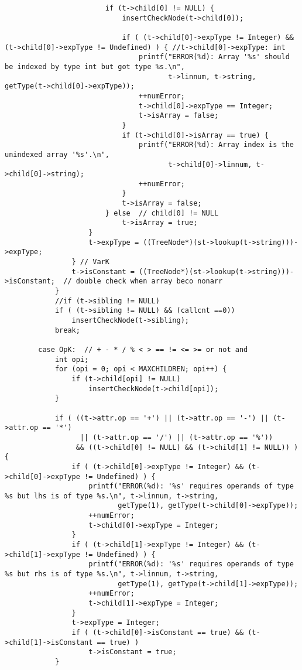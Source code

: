 \documentclass[12pt]{book}
\begin{document}
\begin{lstlisting}
                        if (t->child[0] != NULL) {
                            insertCheckNode(t->child[0]);

                            if ( (t->child[0]->expType != Integer) && (t->child[0]->expType != Undefined) ) { //t->child[0]->expType: int
                                printf("ERROR(%d): Array '%s' should be indexed by type int but got type %s.\n", 
                                       t->linnum, t->string, getType(t->child[0]->expType));
                                ++numError;
                                t->child[0]->expType == Integer;
                                t->isArray = false;
                            }
                            if (t->child[0]->isArray == true) {
                                printf("ERROR(%d): Array index is the unindexed array '%s'.\n", 
                                       t->child[0]->linnum, t->child[0]->string);
                                ++numError;
                            }
                            t->isArray = false;
                        } else  // child[0] != NULL
                            t->isArray = true; 
                    }
                    t->expType = ((TreeNode*)(st->lookup(t->string)))->expType;
                } // VarK
                t->isConstant = ((TreeNode*)(st->lookup(t->string)))->isConstant;  // double check when array beco nonarr
            }
            //if (t->sibling != NULL)
            if ( (t->sibling != NULL) && (callcnt ==0))
                insertCheckNode(t->sibling);
            break;

        case OpK:  // + - * / % < > == != <= >= or not and
            int opi;
            for (opi = 0; opi < MAXCHILDREN; opi++) {
                if (t->child[opi] != NULL)
                    insertCheckNode(t->child[opi]);
            }
 
            if ( ((t->attr.op == '+') || (t->attr.op == '-') || (t->attr.op == '*') 
                  || (t->attr.op == '/') || (t->attr.op == '%'))
                 && ((t->child[0] != NULL) && (t->child[1] != NULL)) ) {
                if ( (t->child[0]->expType != Integer) && (t->child[0]->expType != Undefined) ) {
                    printf("ERROR(%d): '%s' requires operands of type %s but lhs is of type %s.\n", t->linnum, t->string, 
                           getType(1), getType(t->child[0]->expType));
                    ++numError;
                    t->child[0]->expType = Integer; 
                } 
                if ( (t->child[1]->expType != Integer) && (t->child[1]->expType != Undefined) ) {
                    printf("ERROR(%d): '%s' requires operands of type %s but rhs is of type %s.\n", t->linnum, t->string, 
                           getType(1), getType(t->child[1]->expType));
                    ++numError;
                    t->child[1]->expType = Integer; 
                } 
                t->expType = Integer; 
                if ( (t->child[0]->isConstant == true) && (t->child[1]->isConstant == true) )
                    t->isConstant = true;
            }  


\end{lstlisting}
\end{document}
